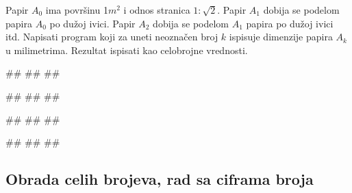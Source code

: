 \begin{Exercise}[difficulty=1, label=p1.papir] 
Papir $A_0$ ima povr\v sinu 1$m^2$ i odnos stranica
$1:\sqrt{2}$. Papir $A_1$ dobija se podelom papira $A_0$ po dužoj
ivici. Papir $A_2$ dobija se podelom $A_1$ papira po dužoj ivici
itd. Napisati program koji za uneti neoznačen broj $k$ ispisuje 
dimenzije papira $A_k$ u milimetrima. Rezultat ispisati kao celobrojne
vrednosti.  
  
\begin{miditest}
\begin{upotreba}{1}
#\naslovInt#
##
##
\end{upotreba}
\end{miditest}
\begin{miditest}
\begin{upotreba}{2}
#\naslovInt#
##
##
\end{upotreba}
\end{miditest}

\begin{miditest}
\begin{upotreba}{3}
#\naslovInt#
##
##
\end{upotreba}
\end{miditest}
\begin{miditest}
\begin{upotreba}{4}
#\naslovInt#
##
##
\end{upotreba}
\end{miditest}
\end{Exercise}
\begin{Answer}[ref=p1.papir]
\end{Answer}


\subsection{Obrada celih brojeva, rad sa ciframa broja}

